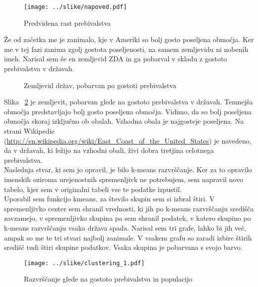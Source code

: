 \documentclass[11pt,a4paper]{article}
\begin{document}
\begin{figure}[H]
  \texttt{[image: ../slike/napoved.pdf]}
  \caption{Predvidena rast prebivalstva}
  \label{fig:Slika 5}
\end{figure}
\pagebreak

Že od začetka me je zanimalo, kje v Ameriki so bolj gosto poseljena območja. Ker me v tej fazi zanima zgolj gostota poseljenosti, na samem zemljevidu ni nobenih imeh. Narisal sem še en zemljevid ZDA in ga pobarval v skladu z gostoto prebivalstva v državah.\\

\begin{figure}[H]
  \caption{Zemljevid držav, pobarvan po gostoti prebivalstva}
  \label{fig:Zemljevid 2}
\end{figure}
\pagebreak

Slika ~\ref{fig:Zemljevid 2} je zemljevit, pobarvan glede na gostoto prebivalstva v državah. Temnejša območja predstavljajo bolj gosto poseljena območja. Vidimo, da so bolj poseljena območja skoraj izključno ob obalah. Vzhodna obala je najgosteje poseljena. Na strani Wikipedie (\url{http://en.wikipedia.org/wiki/East_Coast_of_the_United_States}) je navedeno, da v državah, ki ležijo na vzhodni obali, živi dobra tretjina celotnega prebivalstva.\\

Naslednja stvar, ki sem jo opravil, je bilo k-means razvrščanje. Ker za to opravilo imenskih oziroma urejenostnih spremenljivk ne potrebujem, sem napravil novo tabelo, kjer sem v originalni tabeli vse te podatke izpustil.\\
Uporabil sem funkcijo kmeans, za število skupin sem si izbral štiri.
V spremenljivko center sem shranil vrednosti, ki jih po k-means razvrščanju središča zavzamejo, v spremenljivko skupina pa sem shranil podatek, v katero skupino po k-means razvrščanju vsaka država spada.
Narisal sem tri grafe, lahko bi jih več, ampak so me te tri stvari najbolj zanimale. V vsakem grafu so zaradi izbire štirih središč tudi štiri skupine podatkov. Vsaka skupina je pobarvana s svojo barvo.\\

\begin{figure}[H]
  \texttt{[image: ../slike/clustering\_1.pdf]}
  \caption{Razvrščanje glede na gostoto prebivalstva in populacijo}
  \label{fig:Slika 6}
\end{figure}
\end{document}
